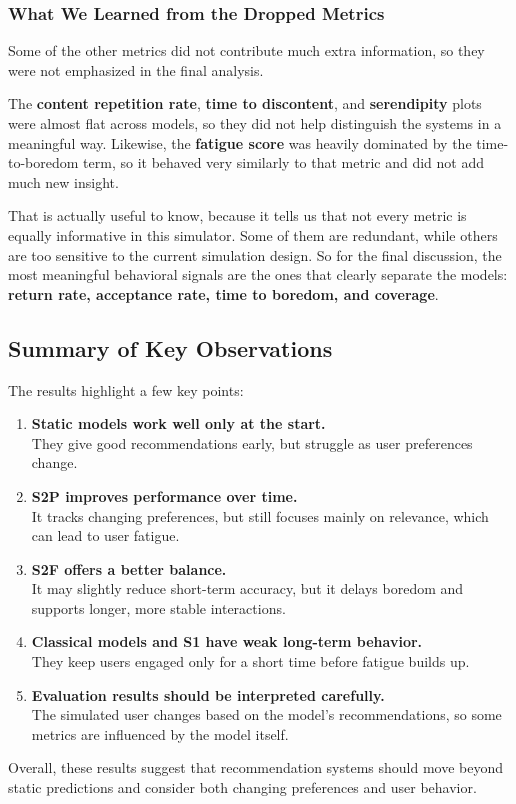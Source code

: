 \subsubsection{What We Learned from the Dropped Metrics}

Some of the other metrics did not contribute much extra information, so they were not emphasized in the final analysis.

The \textbf{content repetition rate}, \textbf{time to discontent}, and \textbf{serendipity} plots were almost flat across models, 
so they did not help distinguish the systems in a meaningful way. 
Likewise, the \textbf{fatigue score} was heavily dominated by the time-to-boredom term, so it behaved very similarly to that metric and did not add much new insight.

That is actually useful to know, because it tells us that not every metric is equally informative in this simulator. 
Some of them are redundant, while others are too sensitive to the current simulation design. 
So for the final discussion, the most meaningful behavioral signals are the ones that clearly separate the models: \textbf{return rate, acceptance rate, time to boredom, and coverage}.

\subsection{Summary of Key Observations}

The results highlight a few key points:

\begin{enumerate}
    \item \textbf{Static models work well only at the start.} \\
        They give good recommendations early, but struggle as user preferences change.
    \item \textbf{S2P improves performance over time.} \\
        It tracks changing preferences, but still focuses mainly on relevance, which can lead to user fatigue.
    \item \textbf{S2F offers a better balance.} \\
        It may slightly reduce short-term accuracy, but it delays boredom and supports longer, more stable interactions.
    \item \textbf{Classical models and S1 have weak long-term behavior.} \\
        They keep users engaged only for a short time before fatigue builds up.
    \item \textbf{Evaluation results should be interpreted carefully.} \\
        The simulated user changes based on the model’s recommendations, so some metrics are influenced by the model itself.
\end{enumerate}

Overall, these results suggest that recommendation systems should move beyond static predictions and consider both changing preferences and user behavior.
